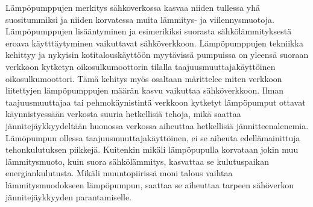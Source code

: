 Lämpöpumppujen merkitys sähkoverkossa kasvaa niiden tullessa yhä suositummiksi ja niiden korvatessa muita lämmitys- ja viilennysmuotoja. Lämpöpumppujen lisääntyminen ja esimerikiksi suorasta sähkölämmityksestä eroava käytttäytyminen vaikuttavat sähköverkkoon. Lämpöpumppujen tekniikka kehittyy ja nykyisin kotitalouskäyttöön myytävissä pumpuissa on yleensä suoraan verkkoon kytketyn oikosulkumoottorin tilalla taajuusmuuttajakäyttöinen oikosulkumoottori. Tämä kehitys myös osaltaan märittelee miten verkkoon liitettyjen lämpöpumppujen määrän kasvu vaikuttaa sähköverkkoon. Ilman taajuusmuuttajaa tai pehmokäynistintä verkkoon kytketyt lämpöpumput ottavat käynnistyessään verkosta suuria hetkellisiä tehoja, mikä saattaa jännitejäykkyydeltään huonossa verkossa aiheuttaa hetkellisiä jännitteenalenemia. Lämöpumpun ollessa taajuusmuuttajakäyttöinen, ei se aiheuta edellämainittuja tehonkulutuksen piikkejä. Kuitenkin mikäli lämpöpupulla korvataan jokin muu lämmitysmuoto, kuin suora sähkölämmitys, kasvattaa se kulutuspaikan energiankulutusta. Mikäli muuntopiirissä moni talous vaihtaa lämmitysmuodokseen lämpöpumpun, saattaa se aiheuttaa tarpeen sähöverkon jännitejäykkyyden parantamiselle.
